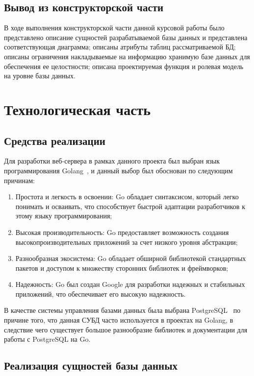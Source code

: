 \documentclass{bmstu}
\begin{document}
\section*{Вывод из конструкторской части}

В ходе выполнения конструкторской части данной курсовой работы было представлено описание сущностей разрабатываемой базы данных и представлена соответствующая диаграмма; описаны атрибуты таблиц рассматриваемой БД; описаны ограничения накладываемые на информацию хранимую базе данных для обеспечения ее целостности; описана проектируемая функция и ролевая модель на уровне базы данных.

\chapter{Технологическая часть}

\section{Средства реализации}

Для разработки веб-сервера в рамках данного проекта был выбран язык программирования Golang~\cite{Go}, и данный выбор был обоснован по следующим причинам:

\begin{enumerate}
	\item Простота и легкость в освоении: Go обладает синтаксисом, который легко понимать и осваивать, что способствует быстрой адаптации разработчиков к этому языку программирования;
	\item Высокая производительность: Go предоставляет возможность создания высокопроизводительных приложений за счет низкого уровня абстракции;
	\item Разнообразная экосистема: Go обладает обширной библиотекой стандартных пакетов и доступом к множеству сторонних библиотек и фреймворков;
	\item Надежность: Go был создан Google для разработки надежных и стабильных приложений, что обеспечивает его высокую надежность.
\end{enumerate}

В качестве системы управления базами данных была выбрана PostgreSQL~\cite{Postgres} по причине того, что данная СУБД часто используется в проектах на Golang, в следствие чего существует большое разнообразие библиотек и документации для работы с PostgreSQL на Go.

\pagebreak

\section{Реализация сущностей базы данных}
\end{document}
